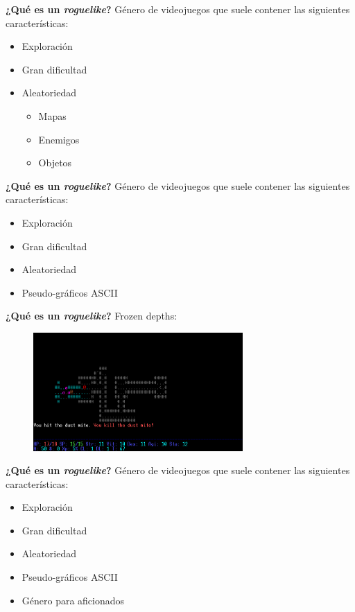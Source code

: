 \begin{tframe}{\textbf{¿Qué es un \textit{roguelike}?}}
	Género de videojuegos que suele contener las siguientes características:
	\begin{itemize}
		\item Exploración
		\item Gran dificultad
		\item<+-| alert@+> Aleatoriedad
		\begin{itemize}
			\item Mapas
			\item Enemigos
			\item Objetos
		\end{itemize}
	\end{itemize}
\end{tframe}

\begin{tframe}{\textbf{¿Qué es un \textit{roguelike}?}}
	Género de videojuegos que suele contener las siguientes características:
	\begin{itemize}
		\item Exploración
		\item Gran dificultad
		\item Aleatoriedad
		\item<+-| alert@+> Pseudo-gráficos ASCII
	\end{itemize}
\end{tframe}

\begin{tframe}{\textbf{¿Qué es un \textit{roguelike}?}}
	Frozen depths:
	\begin{figure}[h]
		\includegraphics[width=8cm]{../img/frozendepths}
	\end{figure}
\end{tframe}

\begin{tframe}{\textbf{¿Qué es un \textit{roguelike}?}}
	Género de videojuegos que suele contener las siguientes características:
	\begin{itemize}
		\item Exploración
		\item Gran dificultad
		\item Aleatoriedad
		\item Pseudo-gráficos ASCII
		\item<+-| alert@+> Género para aficionados
	\end{itemize}
\end{tframe}

